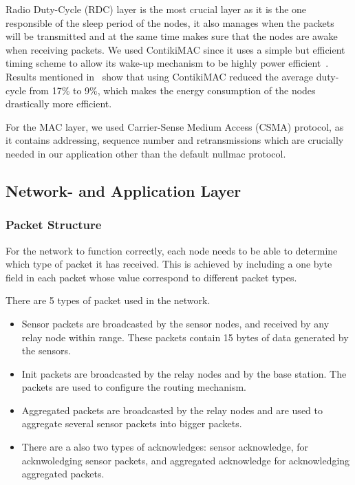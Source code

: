 \documentclass[conference]{IEEEtran}
\begin{document}
Radio Duty-Cycle (RDC) layer is the most crucial layer as it is the one responsible of 
the sleep period of the nodes, it also manages when the packets will be transmitted 
and at the same time makes sure that the nodes are awake when receiving packets. 
We used ContikiMAC since it uses a simple but efficient timing scheme to allow its wake-up 
mechanism to be highly power efficient~\cite{ContikiDutyCycling}. Results mentioned in~\cite{ContikiMacProt} show that using 
ContikiMAC reduced the average duty-cycle from 17\% to 9\%, which makes the energy consumption 
of the nodes drastically more efficient.  

For the MAC layer, we used Carrier-Sense Medium Access (CSMA) protocol, as it contains 
addressing, sequence number and retransmissions which are crucially needed in our 
application other than the default nullmac protocol.

\subsection{Network- and Application Layer}

\subsubsection{Packet Structure}

For the network to function correctly, each node needs to be able to determine
which type of packet it has received. This is achieved by including a one
byte field in each packet whose value correspond to different packet types.

There are 5 types of packet used in the network.
\begin{itemize}
    \item Sensor packets are broadcasted by the sensor nodes, and received
    by any relay node within range. These packets contain 15 bytes of data
    generated by the sensors.
    \item Init packets are broadcasted by the relay nodes and by the base
    station. The packets are used to configure the routing mechanism.
    \item Aggregated packets are broadcasted by the relay nodes and are
    used to aggregate several sensor packets into bigger packets.
    \item There are a also two types of acknowledges: sensor acknowledge, for
    acknwoledging sensor packets, and aggregated acknowledge for acknowledging
    aggregated packets.
\end{itemize}
\end{document}
